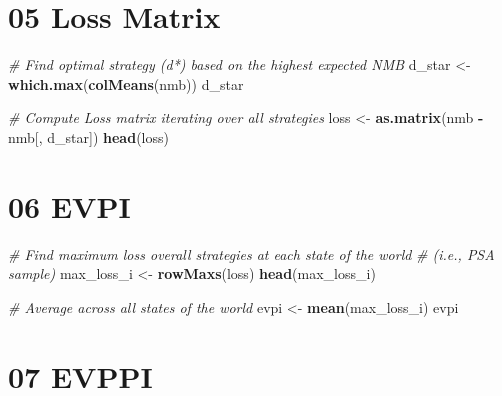 \documentclass[
]{article}
\newenvironment{Shaded}{\begin{snugshade}}{\end{snugshade}}
\newcommand{\CommentTok}[1]{\textcolor[rgb]{0.56,0.35,0.01}{\textit{#1}}}
\newcommand{\KeywordTok}[1]{\textcolor[rgb]{0.13,0.29,0.53}{\textbf{#1}}}
\newcommand{\NormalTok}[1]{#1}
\newcommand{\OperatorTok}[1]{\textcolor[rgb]{0.81,0.36,0.00}{\textbf{#1}}}
\newcommand{\StringTok}[1]{\textcolor[rgb]{0.31,0.60,0.02}{#1}}
\begin{document}
\hypertarget{loss-matrix}{%
\section{05 Loss Matrix}\label{loss-matrix}}

\begin{Shaded}
\begin{Highlighting}[]
\CommentTok{# Find optimal strategy (d*) based on the highest expected NMB}
\NormalTok{d_star <-}\StringTok{ }\KeywordTok{which.max}\NormalTok{(}\KeywordTok{colMeans}\NormalTok{(nmb))}
\NormalTok{d_star}

\CommentTok{# Compute Loss matrix iterating over all strategies}
\NormalTok{loss <-}\StringTok{ }\KeywordTok{as.matrix}\NormalTok{(nmb }\OperatorTok{-}\StringTok{ }\NormalTok{nmb[, d_star])}
\KeywordTok{head}\NormalTok{(loss)}
\end{Highlighting}
\end{Shaded}

\hypertarget{evpi}{%
\section{06 EVPI}\label{evpi}}

\begin{Shaded}
\begin{Highlighting}[]
\CommentTok{# Find maximum loss overall strategies at each state of the world }
\CommentTok{# (i.e., PSA sample)}
\NormalTok{max_loss_i <-}\StringTok{ }\KeywordTok{rowMaxs}\NormalTok{(loss)}
\KeywordTok{head}\NormalTok{(max_loss_i)}

\CommentTok{# Average across all states of the world}
\NormalTok{evpi <-}\StringTok{ }\KeywordTok{mean}\NormalTok{(max_loss_i)}
\NormalTok{evpi}
\end{Highlighting}
\end{Shaded}

\hypertarget{evppi}{%
\section{07 EVPPI}\label{evppi}}
\end{document}
